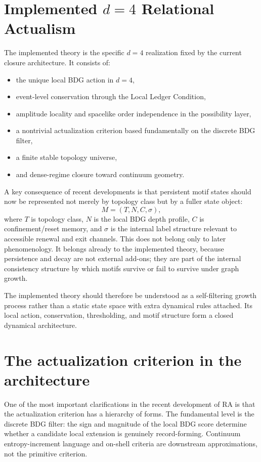 \documentclass[11pt]{article}
\begin{document}
\section{Implemented \texorpdfstring{$d=4$}{d=4} Relational Actualism}\label{sec:implemented}
The implemented theory is the specific $d=4$ realization fixed by the current closure architecture. It consists of:
\begin{itemize}
    \item the unique local BDG action in $d=4$,
    \item event-level conservation through the Local Ledger Condition,
    \item amplitude locality and spacelike order independence in the possibility layer,
    \item a nontrivial actualization criterion based fundamentally on the discrete BDG filter,
    \item a finite stable topology universe,
    \item and dense-regime closure toward continuum geometry.
\end{itemize}

A key consequence of recent developments is that persistent motif states should now be represented not merely by topology class but by a fuller state object:
\[
M=(T,N,C,\sigma),
\]
where $T$ is topology class, $N$ is the local BDG depth profile, $C$ is confinement/reset memory, and $\sigma$ is the internal label structure relevant to accessible renewal and exit channels. This does not belong only to later phenomenology. It belongs already to the implemented theory, because persistence and decay are not external add-ons; they are part of the internal consistency structure by which motifs survive or fail to survive under graph growth.

The implemented theory should therefore be understood as a self-filtering growth process rather than a static state space with extra dynamical rules attached. Its local action, conservation, thresholding, and motif structure form a closed dynamical architecture.

\section{The actualization criterion in the architecture}\label{sec:actualization}
One of the most important clarifications in the recent development of RA is that the actualization criterion has a hierarchy of forms. The fundamental level is the discrete BDG filter: the sign and magnitude of the local BDG score determine whether a candidate local extension is genuinely record-forming. Continuum entropy-increment language and on-shell criteria are downstream approximations, not the primitive criterion.
\end{document}
